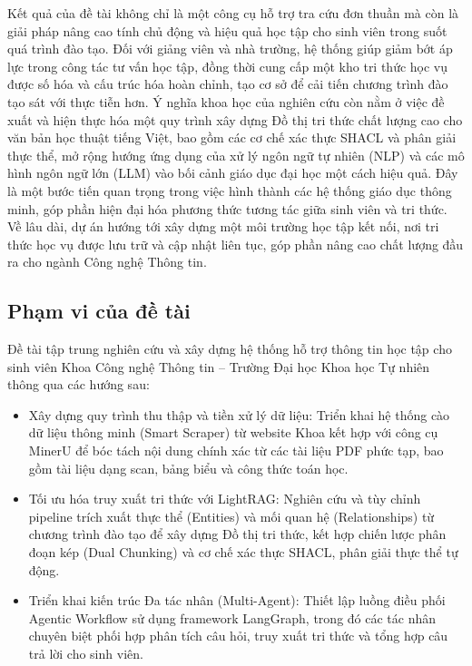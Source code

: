 \begin{refsection}
Kết quả của đề tài không chỉ là một công cụ hỗ trợ tra cứu đơn thuần mà còn là giải pháp nâng cao tính chủ động và hiệu quả học tập cho sinh viên trong suốt quá trình đào tạo. Đối với giảng viên và nhà trường, hệ thống giúp giảm bớt áp lực trong công tác tư vấn học tập, đồng thời cung cấp một kho tri thức học vụ được số hóa và cấu trúc hóa hoàn chỉnh, tạo cơ sở để cải tiến chương trình đào tạo sát với thực tiễn hơn. Ý nghĩa khoa học của nghiên cứu còn nằm ở việc đề xuất và hiện thực hóa một quy trình xây dựng Đồ thị tri thức chất lượng cao cho văn bản học thuật tiếng Việt, bao gồm các cơ chế xác thực SHACL và phân giải thực thể, mở rộng hướng ứng dụng của xử lý ngôn ngữ tự nhiên (NLP) và các mô hình ngôn ngữ lớn (LLM) vào bối cảnh giáo dục đại học một cách hiệu quả. Đây là một bước tiến quan trọng trong việc hình thành các hệ thống giáo dục thông minh, góp phần hiện đại hóa phương thức tương tác giữa sinh viên và tri thức. Về lâu dài, dự án hướng tới xây dựng một môi trường học tập kết nối, nơi tri thức học vụ được lưu trữ và cập nhật liên tục, góp phần nâng cao chất lượng đầu ra cho ngành Công nghệ Thông tin.

\subsection*{\thepropsubsec\quad Phạm vi của đề tài}

Đề tài tập trung nghiên cứu và xây dựng hệ thống hỗ trợ thông tin học tập cho sinh viên Khoa Công nghệ Thông tin -- Trường Đại học Khoa học Tự nhiên thông qua các hướng sau:

\begin{itemize}[label={--}, leftmargin=1.5em]
    \item Xây dựng quy trình thu thập và tiền xử lý dữ liệu: Triển khai hệ thống cào dữ liệu thông minh (Smart Scraper) từ website Khoa kết hợp với công cụ MinerU để bóc tách nội dung chính xác từ các tài liệu PDF phức tạp, bao gồm tài liệu dạng scan, bảng biểu và công thức toán học.
    \item Tối ưu hóa truy xuất tri thức với LightRAG: Nghiên cứu và tùy chỉnh pipeline trích xuất thực thể (Entities) và mối quan hệ (Relationships) từ chương trình đào tạo để xây dựng Đồ thị tri thức, kết hợp chiến lược phân đoạn kép (Dual Chunking) và cơ chế xác thực SHACL, phân giải thực thể tự động.
    \item Triển khai kiến trúc Đa tác nhân (Multi-Agent): Thiết lập luồng điều phối Agentic Workflow sử dụng framework LangGraph, trong đó các tác nhân chuyên biệt phối hợp phân tích câu hỏi, truy xuất tri thức và tổng hợp câu trả lời cho sinh viên.
\end{itemize}


\end{refsection}
